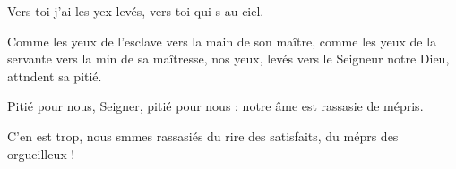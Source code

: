 \item Vers toi j’ai les yex levés,\psstar{} vers toi qui s au ciel.
\item Comme les yeux de l’esclave vers la main de son maître,\pscross{} comme les yeux de la servante vers la min de sa maîtresse,\psstar{} nos yeux, levés vers le Seigneur notre Dieu, attndent sa pitié.
\item Pitié pour nous, Seigner, pitié pour nous :\psstar{} notre âme est rassasie de mépris.
\item C’en est trop, nous smmes rassasiés\psstar{} du rire des satisfaits, du méprs des orgueilleux !